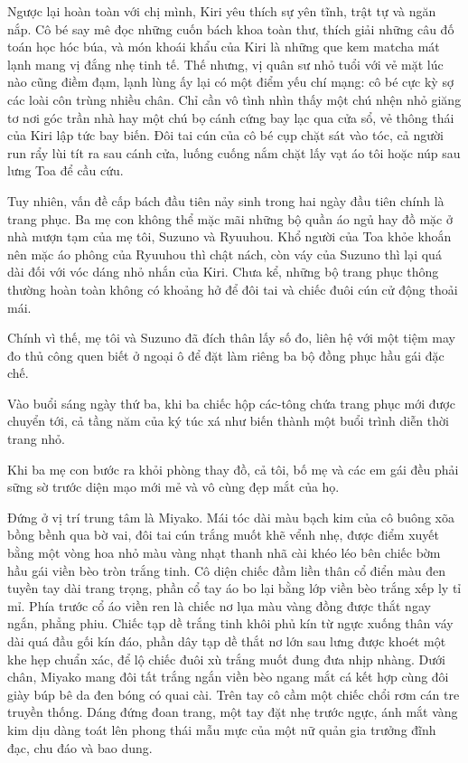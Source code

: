 \documentclass[../main.tex]{subfiles}
\begin{document}
Ngược lại hoàn toàn với chị mình, Kiri yêu thích sự yên tĩnh, trật tự và ngăn nắp. Cô bé say mê đọc những cuốn bách khoa toàn thư, thích giải những câu đố toán học hóc búa, và món khoái khẩu của Kiri là những que kem matcha mát lạnh mang vị đắng nhẹ tinh tế. Thế nhưng, vị quân sư nhỏ tuổi với vẻ mặt lúc nào cũng điềm đạm, lạnh lùng ấy lại có một điểm yếu chí mạng: cô bé cực kỳ sợ các loài côn trùng nhiều chân. Chỉ cần vô tình nhìn thấy một chú nhện nhỏ giăng tơ nơi góc trần nhà hay một chú bọ cánh cứng bay lạc qua cửa sổ, vẻ thông thái của Kiri lập tức bay biến. Đôi tai cún của cô bé cụp chặt sát vào tóc, cả người run rẩy lùi tít ra sau cánh cửa, luống cuống nắm chặt lấy vạt áo tôi hoặc núp sau lưng Toa để cầu cứu.

Tuy nhiên, vấn đề cấp bách đầu tiên nảy sinh trong hai ngày đầu tiên chính là trang phục. Ba mẹ con không thể mặc mãi những bộ quần áo ngủ hay đồ mặc ở nhà mượn tạm của mẹ tôi, Suzuno và Ryuuhou. Khổ người của Toa khỏe khoắn nên mặc áo phông của Ryuuhou thì chật nách, còn váy của Suzuno thì lại quá dài đối với vóc dáng nhỏ nhắn của Kiri. Chưa kể, những bộ trang phục thông thường hoàn toàn không có khoảng hở để đôi tai và chiếc đuôi cún cử động thoải mái.

Chính vì thế, mẹ tôi và Suzuno đã đích thân lấy số đo, liên hệ với một tiệm may đo thủ công quen biết ở ngoại ô để đặt làm riêng ba bộ đồng phục hầu gái đặc chế.

Vào buổi sáng ngày thứ ba, khi ba chiếc hộp các-tông chứa trang phục mới được chuyển tới, cả tầng năm của ký túc xá như biến thành một buổi trình diễn thời trang nhỏ.

Khi ba mẹ con bước ra khỏi phòng thay đồ, cả tôi, bố mẹ và các em gái đều phải sững sờ trước diện mạo mới mẻ và vô cùng đẹp mắt của họ.

Đứng ở vị trí trung tâm là Miyako. Mái tóc dài màu bạch kim của cô buông xõa bồng bềnh qua bờ vai, đôi tai cún trắng muốt khẽ vểnh nhẹ, được điểm xuyết bằng một vòng hoa nhỏ màu vàng nhạt thanh nhã cài khéo léo bên chiếc bờm hầu gái viền bèo tròn trắng tinh. Cô diện chiếc đầm liền thân cổ điển màu đen tuyền tay dài trang trọng, phần cổ tay áo bo lại bằng lớp viền bèo trắng xếp ly tỉ mỉ. Phía trước cổ áo viền ren là chiếc nơ lụa màu vàng đồng được thắt ngay ngắn, phẳng phiu. Chiếc tạp dề trắng tinh khôi phủ kín từ ngực xuống thân váy dài quá đầu gối kín đáo, phần dây tạp dề thắt nơ lớn sau lưng được khoét một khe hẹp chuẩn xác, để lộ chiếc đuôi xù trắng muốt đung đưa nhịp nhàng. Dưới chân, Miyako mang đôi tất trắng ngắn viền bèo ngang mắt cá kết hợp cùng đôi giày búp bê da đen bóng có quai cài. Trên tay cô cầm một chiếc chổi rơm cán tre truyền thống. Dáng đứng đoan trang, một tay đặt nhẹ trước ngực, ánh mắt vàng kim dịu dàng toát lên phong thái mẫu mực của một nữ quản gia trưởng đĩnh đạc, chu đáo và bao dung.
\end{document}
